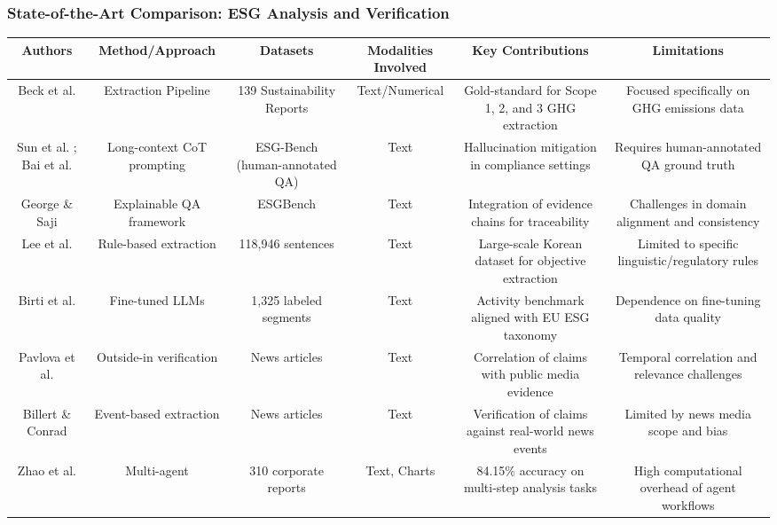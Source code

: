 \documentclass{article}
\begin{document}
\subsubsection{State-of-the-Art Comparison: ESG Analysis and Verification}
\begin{table}[h!]
\centering
\begin{tabular}{|c|c|c|c|c|c|}
\hline
Authors & Method/Approach & Datasets & Modalities Involved & Key Contributions & Limitations \\ \hline
Beck et al.  \parencite{jacob_beck_9548a833} & Extraction Pipeline & 139 Sustainability Reports & Text/Numerical & Gold-standard for Scope 1, 2, and 3 GHG extraction & Focused specifically on GHG emissions data \\ \hline
Sun et al.  \parencite{siqi_sun_f6a51152}; Bai et al.  \parencite{association_for_artificial_intelligence_2026_86e12eae} & Long-context CoT prompting & ESG-Bench (human-annotated QA) & Text & Hallucination mitigation in compliance settings & Requires human-annotated QA ground truth \\ \hline
George \& Saji  \parencite{s__s__george_saji_b30d4b3e} & Explainable QA framework & ESGBench & Text & Integration of evidence chains for traceability & Challenges in domain alignment and consistency \\ \hline
Lee et al.  \parencite{jaeyoung_lee_1894333c} & Rule-based extraction & 118,946 sentences & Text & Large-scale Korean dataset for objective extraction & Limited to specific linguistic/regulatory rules \\ \hline
Birti et al.  \parencite{mattia_birti_c097e3e8} & Fine-tuned LLMs & 1,325 labeled segments & Text & Activity benchmark aligned with EU ESG taxonomy & Dependence on fine-tuning data quality \\ \hline
Pavlova et al.  \parencite{mariya_pavlova_259be499} & Outside-in verification & News articles & Text & Correlation of claims with public media evidence & Temporal correlation and relevance challenges \\ \hline
Billert \& Conrad  \parencite{fabian_billert_a5fbb687} & Event-based extraction & News articles & Text & Verification of claims against real-world news events & Limited by news media scope and bias \\ \hline
Zhao et al.  \parencite{yilei_zhao_b7bbd9c8} & Multi-agent & 310 corporate reports & Text, Charts & 84.15\% accuracy on multi-step analysis tasks & High computational overhead of agent workflows \\ \hline

\end{tabular}
\end{table}
\end{document}
